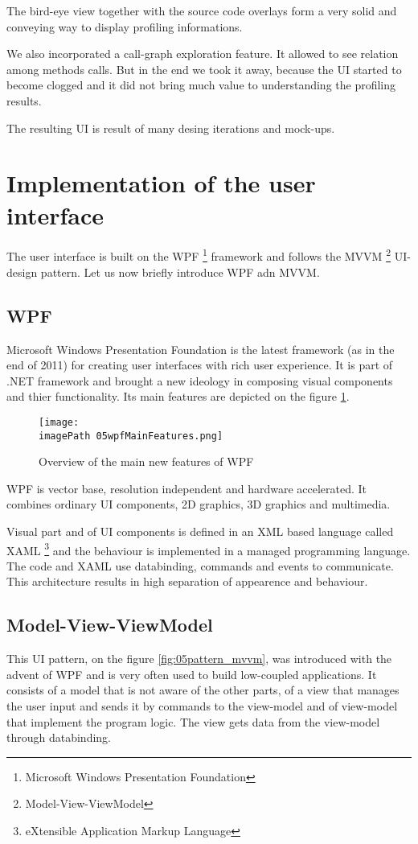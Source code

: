 The bird-eye view together with the source code overlays form a very solid and conveying way to display profiling informations. 

We also incorporated a call-graph exploration feature. It allowed to see relation among methods calls. But in the end we took it away, because the UI started to become clogged and it did not bring much value to understanding the profiling results. 

The resulting UI is result of many desing iterations and mock-ups.

\section{Implementation of the user interface}
The user interface is built on the WPF \footnote{Microsoft Windows Presentation Foundation} framework \cite{WPF4Unleashed} and follows the MVVM \footnote{Model-View-ViewModel} \cite{MVVM2011} UI-design pattern. Let us now briefly introduce WPF adn MVVM.

\subsection{WPF}
Microsoft Windows Presentation Foundation is the latest framework (as in the end of 2011) for creating user interfaces with rich user experience. It is part of .NET framework and brought a new ideology in composing visual components and thier functionality. Its main features are depicted on the figure \ref{fig:05wpfMainFeatures}.

\begin{figure}
	\centering
		\texttt{[image: \\imagePath 05wpfMainFeatures.png]}
		\caption{Overview of the main new features of WPF \cite{WPFpage}}
	\label{fig:05wpfMainFeatures}
\end{figure}

WPF is vector base, resolution independent and hardware accelerated. It combines ordinary UI components, 2D graphics, 3D graphics and multimedia. 

Visual part and of UI components is defined in an XML based language called \linebreak XAML \footnote{eXtensible Application Markup Language} and the behaviour is implemented in a managed programming language. The code and XAML use databinding, commands and events to communicate. This architecture results in high separation of appearence and behaviour.

\subsection{Model-View-ViewModel}
This UI pattern, on the figure \ref{fig:05pattern_mvvm}, was introduced with the advent of WPF and is very often used to build low-coupled applications. It consists of a model that is not aware of the other parts, of a view that manages the user input and sends it by commands to the view-model and of view-model that implement the program logic. The view gets data from the view-model through databinding.

